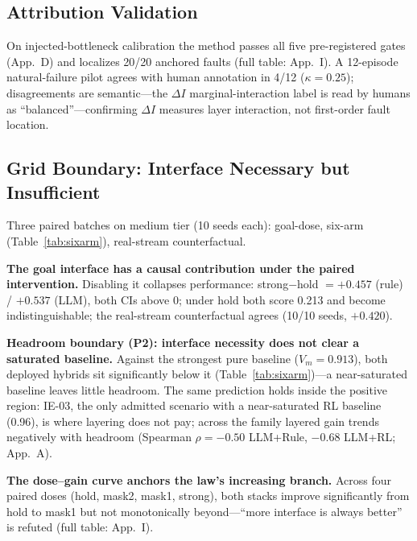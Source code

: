 \documentclass[sigconf,anonymous]{aamas}
\newcommand{\sapp}[1]{App.~#1}
\begin{document}
\subsection{Attribution Validation}\label{sec:attrval}

On injected-bottleneck calibration the method passes all five pre-registered gates (\sapp{D}) and localizes 20/20 anchored faults (full table: \sapp{I}). A 12-episode natural-failure pilot agrees with human annotation in 4/12 ($\kappa=0.25$); disagreements are semantic---the $\Delta I$ marginal-interaction label is read by humans as ``balanced''---confirming $\Delta I$ measures layer interaction, not first-order fault location.

\subsection{Grid Boundary: Interface Necessary but Insufficient}\label{sec:boundary}

Three paired batches on medium tier (10 seeds each): goal-dose, six-arm (Table~\ref{tab:sixarm}), real-stream counterfactual.

\textbf{The goal interface has a causal contribution under the paired intervention.} Disabling it collapses performance: strong$-$hold $= +0.457$ (rule) / $+0.537$ (LLM), both CIs above 0; under hold both score 0.213 and become indistinguishable; the real-stream counterfactual agrees (10/10 seeds, $+0.420$).

\textbf{Headroom boundary (P2): interface necessity does not clear a saturated baseline.}
Against the strongest pure baseline ($V_m=0.913$), both deployed hybrids sit significantly below it (Table~\ref{tab:sixarm})---a near-saturated baseline leaves little headroom. The same prediction holds inside the positive region: IE-03, the only admitted scenario with a near-saturated RL baseline (0.96), is where layering does not pay; across the family layered gain trends negatively with headroom (Spearman $\rho=-0.50$ LLM+Rule, $-0.68$ LLM+RL; \sapp{A}).

\textbf{The dose--gain curve anchors the law's increasing branch.}
Across four paired doses (hold, mask2, mask1, strong), both stacks improve significantly from hold to mask1 but not monotonically beyond---``more interface is always better'' is refuted (full table: \sapp{I}).
\end{document}
